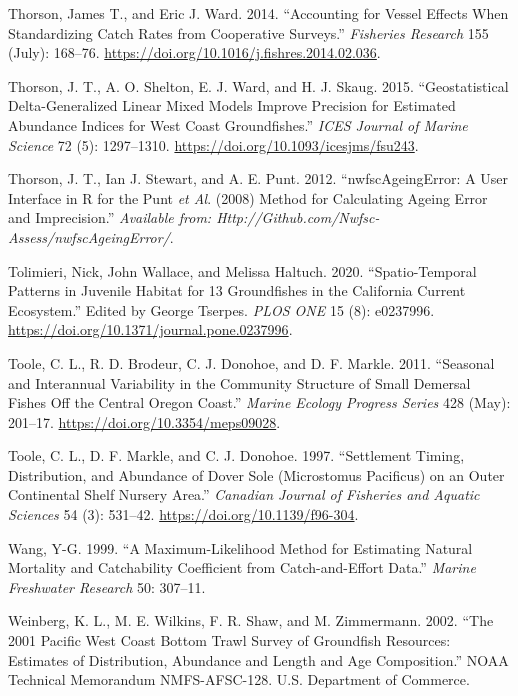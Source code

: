 \documentclass[11pt,
  english,
  a4paper,
]{article}
\begin{document}
\begin{cslreferences}
\leavevmode\hypertarget{ref-thorson_accounting_2014}{}%
Thorson, James T., and Eric J. Ward. 2014. ``Accounting for Vessel Effects When Standardizing Catch Rates from Cooperative Surveys.'' \emph{Fisheries Research} 155 (July): 168--76. \url{https://doi.org/10.1016/j.fishres.2014.02.036}.

\leavevmode\hypertarget{ref-thorson_geostatistical_2015}{}%
Thorson, J. T., A. O. Shelton, E. J. Ward, and H. J. Skaug. 2015. ``Geostatistical Delta-Generalized Linear Mixed Models Improve Precision for Estimated Abundance Indices for West Coast Groundfishes.'' \emph{ICES Journal of Marine Science} 72 (5): 1297--1310. \url{https://doi.org/10.1093/icesjms/fsu243}.

\leavevmode\hypertarget{ref-thorson_nwfscageingerror:_2012}{}%
Thorson, J. T., Ian J. Stewart, and A. E. Punt. 2012. ``nwfscAgeingError: A User Interface in R for the Punt \emph{et Al}. (2008) Method for Calculating Ageing Error and Imprecision.'' \emph{Available from: Http://Github.com/Nwfsc-Assess/nwfscAgeingError/}.

\leavevmode\hypertarget{ref-tolimieri_spatio-temporal_2020}{}%
Tolimieri, Nick, John Wallace, and Melissa Haltuch. 2020. ``Spatio-Temporal Patterns in Juvenile Habitat for 13 Groundfishes in the California Current Ecosystem.'' Edited by George Tserpes. \emph{PLOS ONE} 15 (8): e0237996. \url{https://doi.org/10.1371/journal.pone.0237996}.

\leavevmode\hypertarget{ref-toole_seasonal_2011}{}%
Toole, C. L., R. D. Brodeur, C. J. Donohoe, and D. F. Markle. 2011. ``Seasonal and Interannual Variability in the Community Structure of Small Demersal Fishes Off the Central Oregon Coast.'' \emph{Marine Ecology Progress Series} 428 (May): 201--17. \url{https://doi.org/10.3354/meps09028}.

\leavevmode\hypertarget{ref-toole_settlement_1997}{}%
Toole, C. L., D. F. Markle, and C. J. Donohoe. 1997. ``Settlement Timing, Distribution, and Abundance of Dover Sole (Microstomus Pacificus) on an Outer Continental Shelf Nursery Area.'' \emph{Canadian Journal of Fisheries and Aquatic Sciences} 54 (3): 531--42. \url{https://doi.org/10.1139/f96-304}.

\leavevmode\hypertarget{ref-Wang1999}{}%
Wang, Y-G. 1999. ``A Maximum-Likelihood Method for Estimating Natural Mortality and Catchability Coefficient from Catch-and-Effort Data.'' \emph{Marine Freshwater Research} 50: 307--11.

\leavevmode\hypertarget{ref-weinberg_2001_2002}{}%
Weinberg, K. L., M. E. Wilkins, F. R. Shaw, and M. Zimmermann. 2002. ``The 2001 Pacific West Coast Bottom Trawl Survey of Groundfish Resources: Estimates of Distribution, Abundance and Length and Age Composition.'' NOAA Technical Memorandum NMFS-AFSC-128. U.S. Department of Commerce.


\end{cslreferences}
\end{document}
